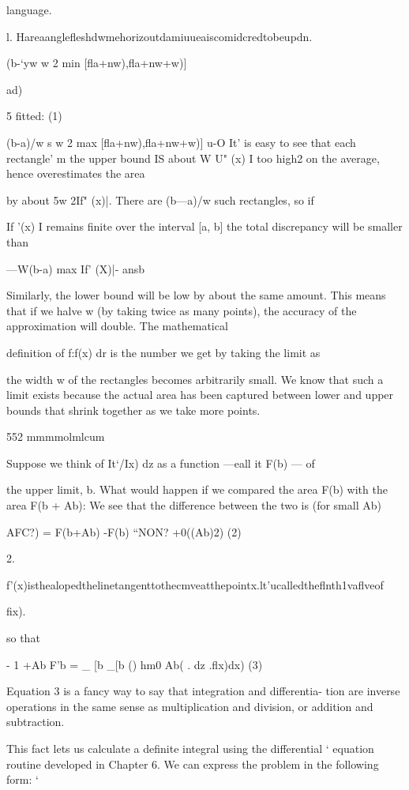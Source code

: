 language.

 

l. Hareaangleﬂeshdwmehorizoutdamiuueaiscomidcredtobeupdn.

(b-‘yw
w 2 min [ﬂa+nw),ﬂa+nw+w)]

ad)

5 fitted: (1)

(b-a)/w
s w 2 max [ﬂa+nw),ﬂa+nw+w)]
u-O
It' is easy to see that each rectangle' m the upper bound IS about
W U" (x) I too high2 on the average, hence overestimates the area

by about 5w 2If" (x)|. There are (b—a)/w such rectangles, so if

If '(x) I remains ﬁnite over the interval [a, b] the total discrepancy
will be smaller than

—W(b-a) max If' (X)|-
ansb

Similarly, the lower bound will be low by about the same amount.
This means that if we halve w (by taking twice as many points),
the accuracy of the approximation will double. The mathematical

deﬁnition of f:f(x) dr is the number we get by taking the limit as

the width w of the rectangles becomes arbitrarily small. We know
that such a limit exists because the actual area has been captured
between lower and upper bounds that shrink together as we take
more points.

552 mmmmolmlcum

Suppose we think of It‘/Ix) dz as a function —eall it F(b) — of

the upper limit, b. What would happen if we compared the
area F(b) with the area F(b + Ab): We see that the difference
between the two is (for small Ab)

AFC?) = F(b+Ab) -F(b) “NON? +0((Ab)2) (2)

 

2.

f'(x)isthealopedthelinetangenttothecmveatthepointx.lt'ucalledtheﬂnth1vaﬂveof

ﬁx).

so that

- 1 +Ab
F'b = _ [b _[b
() hm0 Ab( . dz .ﬂx)dx) (3)

Equation 3 is a fancy way to say that integration and differentia-
tion are inverse operations in the same sense as multiplication
and division, or addition and subtraction.

This fact lets us calculate a definite integral using the differential ‘
equation routine developed in Chapter 6. We can express the
problem in the following form: ‘

